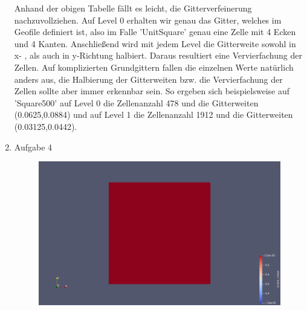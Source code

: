 \documentclass[12pt,a4paper]{scrartcl}
\numberwithin{equation}{section}
\begin{document}
\begin{enumerate}[label=(\roman*)]
\begin{figure}[H]
\end{figure}
Anhand der obigen Tabelle fällt es leicht, die Gitterverfeinerung nachzuvollziehen.
Auf Level 0 erhalten wir genau das Gitter, welches im Geofile definiert ist, also im Falle 'UnitSquare' genau eine Zelle mit 4 Ecken und 4 Kanten.
Anschließend wird mit jedem Level die Gitterweite sowohl in x- , als auch in y-Richtung halbiert. Daraus resultiert eine Vervierfachung der Zellen. \newline
Auf komplizierten Grundgittern fallen die einzelnen Werte natürlich anders aus, die Halbierung der Gitterweiten bzw. die Vervierfachung der Zellen sollte aber immer erkennbar sein. \newline
So ergeben sich beispielsweise auf 'Square500' auf Level 0 die Zellenanzahl 478 und die Gitterweiten (0.0625,0.0884) und auf Level 1 die Zellenanzahl 1912 und die Gitterweiten (0.03125,0.0442). 
\item Aufgabe 4
\newline

\begin{figure}[H]
	\centering
		\includegraphics[width=\textwidth]{../Problem_SimpleMesh_UnitSquarelevel_8/perm.png}
\end{figure} 


\end{enumerate}
\end{document}
